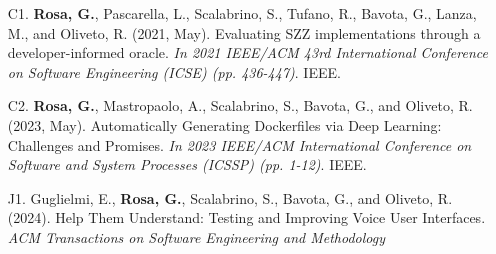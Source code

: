      \begin{itemize}
      \item[C1.] \textbf{Rosa, G.}, Pascarella, L., Scalabrino, S., Tufano, R., Bavota, G., Lanza, M., and Oliveto, R. (2021, May). Evaluating SZZ implementations through a developer-informed oracle. \emph{In 2021 IEEE/ACM 43rd International Conference on Software Engineering (ICSE) (pp. 436-447)}. IEEE.
      \item[C2.] \textbf{Rosa, G.}, Mastropaolo, A., Scalabrino, S., Bavota, G., and Oliveto, R. (2023, May). Automatically Generating Dockerfiles via Deep Learning: Challenges and Promises. \emph{In 2023 IEEE/ACM International Conference on Software and System Processes (ICSSP) (pp. 1-12)}. IEEE.
      \item[J1.] Guglielmi, E., \textbf{Rosa, G.}, Scalabrino, S., Bavota, G., and Oliveto, R. (2024). Help Them Understand: Testing and Improving Voice User Interfaces. \emph{ACM Transactions on Software Engineering and Methodology}
     \end{itemize}